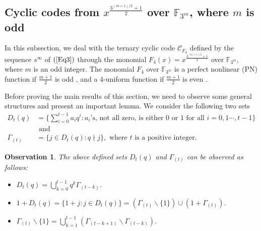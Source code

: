 \documentclass[pdflatex,sn-mathphys-num]{sn-jnl}%
\newtheorem{observation}{Observation}
\theoremstyle{thmstyleone}%
\theoremstyle{thmstyletwo}%
\theoremstyle{thmstylethree}%
\begin{document}



\subsection{Cyclic codes from $x^{\frac{3^{(m+1)/2}+1}{2}}$ over $\mathbb{F}_{3^{m}}$, where $m$ is odd}
In this subsection, we deal with the ternary cyclic code $\mathcal{C}_{F_{4}}$ defined by the sequence $s^{\infty}$ of $(\ref{Eq3})$ through the monomial $F_{4}(x)=x^{\frac{3^{(m+1)/2}+1}{2}}$ over $\mathbb{F}_{3^{m}}$, where $m$ is an odd integer. The monomial $F_{4}$ over $\mathbb{F}_{3^m}$ is a perfect nonlinear (PN) function if $\frac{m+1}{2}$ is odd \cite[Theorem $4.1$]{Uniform3}, and a $4$-uniform function if $\frac{m+1}{2}$ is even \cite[Theorem $2$]{Uniform4}.
\par Before proving the main results of this section, we need to observe some general structures and present an important lemma. 
\vskip 1pt
We consider the following two sets
\begin{align}\label{Eq12}
    D_{t}(q)&=\{\sum_{i=0}^{t-1}a_{i}q^{i}:a_{i}\text{'s, not all zero, is either $0$ or $1$ for all $i=0,1\cdots,t-1$}\} \nonumber \\
   & \text{ and }  \\
    \Gamma_{(t)}&=\{j\in D_{t}(q):q\nmid j\},\text{ where $t$ is a positive integer.} \nonumber
\end{align}
\begin{observation}\label{Ob1}
The above defined sets $D_{t}(q)$ and $\Gamma_{(t)}$ can be observed as follows: 
    \begin{itemize}
    \item $D_{t}(q)=\bigcup_{k=0}^{t-1}q^{k}\Gamma_{(t-k)}$.
    \item $1+D_{t}(q)=\{1+j:j\in D_{t}(q)\}=\left(\Gamma_{(t)}\backslash\{1\}\right)\cup \left(1+\Gamma_{(t)}\right)$.
    \item $\Gamma_{(t)}\backslash\{1\}=\bigcup_{k=1}^{t-1}\left(\Gamma_{(t-k+1)}\backslash\Gamma_{(t-k)}\right)$.
\end{itemize}
\end{observation}
\end{document}

